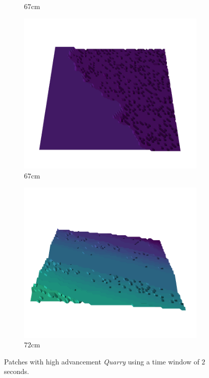 \documentclass[../document.tex]{subfiles}
\begin{document}
\begin{figure}[H]
\begin{subfigure}[b]{0.19\textwidth}
    \caption{$67$cm}
    \end{subfigure}
    \begin{subfigure}[b]{0.19\textwidth}
    \includegraphics[width=\linewidth]{../img/5/quarry/all/best/67-patch-3d-majavi-colormap-8.png}
    \caption{$67$cm}
    \end{subfigure}
    \begin{subfigure}[b]{0.19\textwidth}
    \includegraphics[width=\linewidth]{../img/5/quarry/all/best/72-patch-3d-majavi-colormap-9.png}
    \caption{$72$cm}
    \end{subfigure}
    \caption{Patches with high advancement \emph{Quarry} using a time window of $2$seconds.}
\end{figure}
\end{document}
